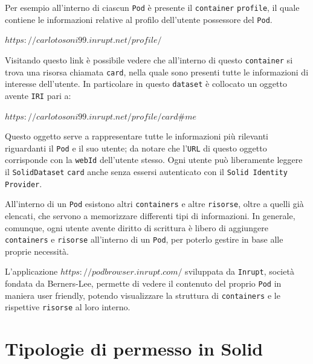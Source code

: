 \medskip

Per esempio all'interno di ciascun {\tt Pod} è presente il {\tt container} {\tt profile}, il quale contiene le informazioni relative al profilo dell'utente possessore del {\tt Pod}.

\medskip

\href{https://carlotosoni99.inrupt.net/profile/}{$https://carlotosoni99.inrupt.net/profile/$}

\medskip

Visitando questo link è possibile vedere che all'interno di questo {\tt container} si trova una risorsa chiamata {\tt card}, nella quale sono presenti tutte le informazioni di interesse dell'utente. In particolare in questo {\tt dataset} è collocato un oggetto avente {\tt IRI} pari a:

\medskip

\href{https://carlotosoni99.inrupt.net/profile/card\#me}{$https://carlotosoni99.inrupt.net/profile/card\#me$}

\medskip

Questo oggetto serve a rappresentare tutte le informazioni più rilevanti riguardanti il {\tt Pod} e il suo utente; da notare che l'{\tt URL} di questo oggetto corrisponde con la {\tt webId} dell'utente stesso. Ogni utente può liberamente leggere il {\tt SolidDataset} {\tt card} anche senza essersi autenticato con il {\tt Solid Identity Provider}.

\medskip

All'interno di un {\tt Pod} esistono altri {\tt containers} e altre {\tt risorse}, oltre a quelli già elencati, che servono a memorizzare differenti tipi di informazioni. In generale, comunque, ogni utente avente diritto di scrittura è libero di aggiungere {\tt containers} e {\tt risorse} all'interno di un {\tt Pod}, per poterlo gestire in base alle proprie necessità.

\medskip

L'applicazione \href{https://podbrowser.inrupt.com/}{$https://podbrowser.inrupt.com/$} sviluppata da {\tt Inrupt}, società fondata da Berners-Lee, permette di vedere il contenuto del proprio {\tt Pod} in maniera user friendly, potendo visualizzare la struttura di {\tt containers} e le rispettive {\tt risorse} al loro interno.

\bigskip

\section{Tipologie di permesso in Solid}

